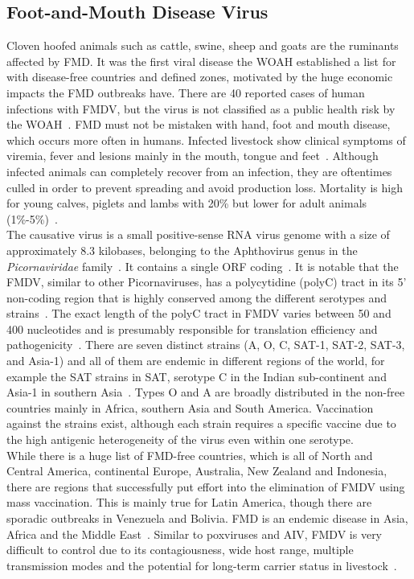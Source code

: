 \subsection{Foot-and-Mouth Disease Virus}
Cloven hoofed animals such as cattle, swine, sheep and goats are the ruminants affected by \ac{FMD}. It was the first viral disease the \ac{WOAH} established a list for with disease-free countries and defined zones, motivated by the huge economic impacts the \ac{FMD} outbreaks have. There are 40 reported cases of human infections with \ac{FMDV}, but the virus is not classified as a public health risk by the \ac{WOAH}~\cite{woah2023fmd}. \ac{FMD} must not be mistaken with hand, foot and mouth disease, which occurs more often in humans. Infected livestock show clinical symptoms of viremia, fever and lesions mainly in the mouth, tongue and feet~\cite{domingo1990genetic}. Although infected animals can completely recover from an infection, they are oftentimes culled in order to prevent spreading and avoid production loss. Mortality is high for young calves, piglets and lambs with 20\% but lower for adult animals (1\%-5\%)~\cite{woah2023fmd}. \\
The causative virus is a small positive-sense \ac{RNA} virus genome with a size of approximately 8.3 kilobases, belonging to the Aphthovirus genus in the \textit{Picornaviridae} family~\cite{tax2021virus}. It contains a single \ac{ORF} coding~\cite{ryan1989specificity}. It is notable that the \ac{FMDV}, similar to other Picornaviruses, has a polycytidine (polyC) tract in its 5' non-coding region that is highly conserved among the different serotypes and strains~\cite{penza2021long}. The exact length of the polyC tract in \ac{FMDV} varies between 50 and 400 nucleotides and is presumably responsible for translation efficiency and pathogenicity~\cite{penza2021long}. There are seven distinct strains (A, O, C, SAT-1, SAT-2, SAT-3, and Asia-1) and all of them are endemic in different regions of the world, for example the SAT strains in \ac{SAT}, serotype C in the Indian sub-continent and Asia-1 in southern Asia~\cite{knowles2003molecular}. Types O and A are broadly distributed in the non-free countries mainly in Africa, southern Asia and South America. Vaccination against the strains exist, although each strain requires a specific vaccine due to the high antigenic heterogeneity of the virus even within one serotype. \\
While there is a huge list of \ac{FMD}-free countries, which is all of North and Central America, continental Europe, Australia, New Zealand and Indonesia, there are regions that successfully put effort into the elimination of \ac{FMDV} using mass vaccination. This is mainly true for Latin America, though there are sporadic outbreaks in Venezuela and Bolivia. \ac{FMD} is an endemic disease in Asia, Africa and the Middle East~\cite{brito2017review}. Similar to poxviruses and \ac{AIV}, \ac{FMDV} is very difficult to control due to its contagiousness, wide host range, multiple transmission modes and the potential for long-term carrier status in livestock~\cite{firestone2019reconstructing}. \\
